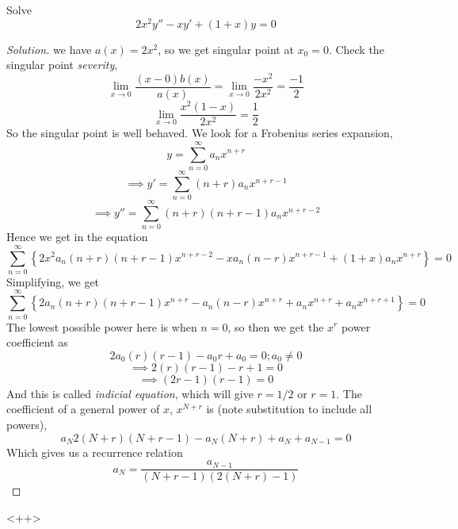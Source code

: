 \begin{example}
  Solve
  \[ 2x^2 y'' - x y' + (1+x) y =0 \]
\end{example}
\begin{proof}[Solution]
  we have $a(x)=2x^2$, so we get singular point at $x_0=0$. Check the singular point
  \emph{severity},
  \[\lim_{x\to 0} \frac{(x-0)b(x)}{a(x)} = \lim_{x\to 0} \frac{-x^2}{2x^2} =
  \frac{-1}{2}\]
  \[\lim_{x\to 0} \frac{x^2 (1-x)}{2x^2} = \frac{1}{2}\]
  So the singular point is well behaved. We look for a Frobenius series expansion,
  \[y= \sum_{n=0}^{\infty} a_n x^{n+r}\]
  \[\implies y'= \sum_{n=0}^{\infty} (n+r)a_n x^{n+r-1}\]
  \[\implies y''= \sum_{n=0}^{\infty} (n+r)(n+r-1)a_n x^{n+r-2}\]
  Hence we get in the equation
  \[\sum_{n=0}^{\infty} \left\{ 2x^2 a_n(n+r)(n+r-1) x^{n+r-2} - xa_n(n-r)x^{n+r-1} +
  (1+x)a_n x^{n+r} \right\} = 0\]
  Simplifying, we get
  \[\sum_{n=0}^{\infty} \left\{ 2a_n(n+r)(n+r-1) x^{n+r} - a_n(n-r)x^{n+r} +
  a_n x^{n+r} + a_n x^{n+r+1} \right\} = 0\]
  The lowest possible power here is when $n=0$, so then we get the $x^r$ power coefficient as 
  \[2a_0(r)(r-1) - a_0 r + a_0 = 0 ; a_0\neq 0\]
  \[\implies 2(r)(r-1) - r + 1 = 0\]
  \[\implies (2r-1)(r-1) = 0\]
  And this is called \emph{indicial equation}, which will give $r= 1/2$ or $r=1$. The
  coefficient of a general power of $x$, $x^{N+r}$ is (note substitution to include all
  powers),
  \[a_N 2 (N+r)(N+r-1) - a_N (N+r) + a_N + a_{N-1} = 0\]
  Which gives us a recurrence relation
  \[a_{N} = \frac{a_{N-1}}{(N+r-1)(2(N+r) - 1)}\]
\end{proof}<++>
